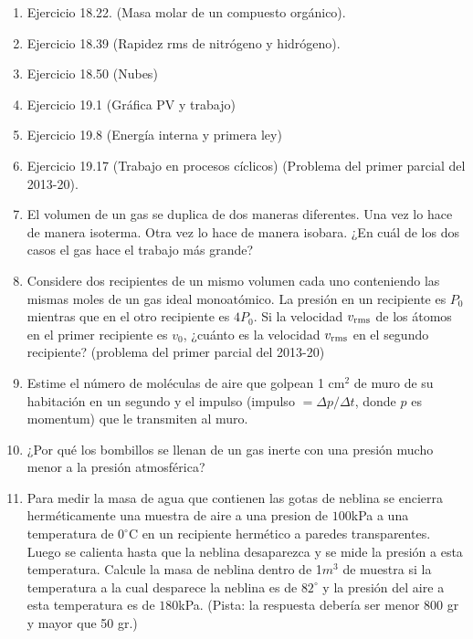 \documentclass{article}
\begin{document}
\begin{enumerate}

 

\item Ejercicio 18.22. (Masa molar de un compuesto org\'anico).

\item Ejercicio 18.39 (Rapidez rms de nitr\'ogeno y hidr\'ogeno).

\item Ejercicio 18.50 (Nubes)

\item Ejercicio 19.1 (Gr\'afica PV y trabajo)

\item Ejercicio 19.8 (Energ\'ia interna y primera ley)

\item Ejercicio 19.17 (Trabajo en procesos c\'iclicos) (Problema del
  primer parcial del 2013-20).

\item El volumen de un gas se duplica de dos maneras diferentes. Una
  vez lo hace de manera isoterma. Otra vez lo hace de manera
  isobara. ¿En cuál de los dos casos el gas hace el trabajo m\'as grande?

\item 
Considere dos recipientes de un mismo volumen cada uno conteniendo las
mismas moles de un gas ideal monoat\'omico. La presi\'on en un
recipiente es $P_{0}$ mientras que en el otro recipiente es
$4P_{0}$. Si la velocidad $v_{\rm rms}$ de los \'atomos en el primer
recipiente es $v_{0}$, ¿cuánto es la velocidad $v_{\rm rms}$ en el segundo
recipiente? (problema del primer parcial del 2013-20)

\item
Estime el n\'umero de mol\'eculas de aire que golpean 1 cm$^2$ de muro
de su habitaci\'on en un segundo y el impulso (impulso $=\Delta p/
\Delta t$, donde $p$ es momentum) que le transmiten al muro.

\item 
¿Por qu\'e los bombillos se llenan de un gas inerte con una presi\'on
mucho menor a la presi\'on atmosf\'erica?

\item 
Para medir la masa de agua que contienen las gotas de neblina se
encierra herm\'eticamente una muestra de aire a una presion de
$100$kPa a una temperatura de $0^{\circ}$C en un recipiente
herm\'etico a paredes transparentes. Luego se calienta hasta que la
neblina desaparezca y se mide la presi\'on a esta temperatura. Calcule
la masa de neblina dentro de 1$m^3$ de muestra si la temperatura a la
cual desparece la neblina es de $82^{\circ}$ y la presi\'on del aire
a esta temperatura es de $180$kPa. (Pista: la respuesta debería ser menor
800 gr y mayor que 50 gr.)

\end{enumerate}
\end{document}
